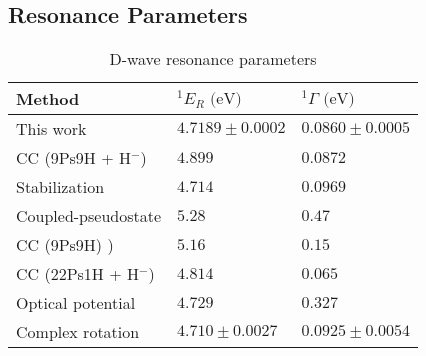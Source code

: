 \documentclass[Dissertation.tex]{subfiles}
\begin{document}
\subsection{Resonance Parameters}
\label{sec:DWaveResonance}



\setlength{\abovecaptionskip}{6pt}   %
\setlength{\belowcaptionskip}{6pt}   %
\begin{table}[H]
\centering
\begin{tabular}{l l l}
\toprule
Method & $^1E_R \text{ (eV)}$ & $^1\Gamma \text{ (eV)}$ \\
\midrule
This work & $4.7189 \pm 0.0002$ & $0.0860 \pm 0.0005$ \\
CC (9Ps9H + H$^-$) \cite{Walters2004} & $4.899$ & $0.0872$ \\
Stabilization \cite{Yan2003} & $4.714$ & $0.0969$ \\
Coupled-pseudostate \cite{Campbell1998} & $5.28$ & $0.47$ \\
CC (9Ps9H) \cite{Blackwood2002}) & $5.16$ & $0.15$ \\
CC (22Ps1H + H$^-$) \cite{Blackwood2002b} & $4.814$ & $0.065$ \\
Optical potential \cite{DiRienzi2002a} & $4.729$ & $0.327$ \\
Complex rotation \cite{Ho1998} & $4.710 \pm 0.0027$ & $0.0925 \pm 0.0054$  \\
\bottomrule
\end{tabular}
\caption{D-wave resonance parameters}
\label{tab:DWaveResonancesOther}
\end{table}



\biblio
\end{document}
